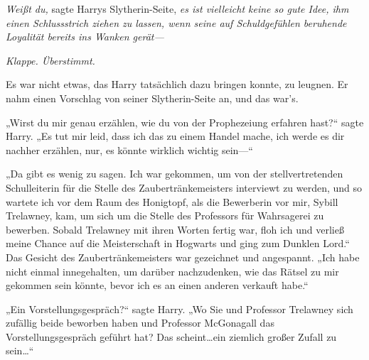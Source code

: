 \emph{Weißt du,} sagte Harrys Slytherin-Seite, \emph{es ist vielleicht keine so gute Idee, ihm einen Schlussstrich ziehen zu lassen, wenn seine auf Schuldgefühlen beruhende Loyalität bereits ins Wanken gerät—}

\emph{Klappe. Überstimmt.}

Es war nicht etwas, das Harry tatsächlich dazu bringen konnte, zu leugnen. Er nahm einen Vorschlag von seiner Slytherin-Seite an, und das war's.

„Wirst du mir genau erzählen, wie du von der Prophezeiung erfahren hast?“ sagte Harry. „Es tut mir leid, dass ich das zu einem Handel mache, ich werde es dir nachher erzählen, nur, es könnte wirklich wichtig sein—“

„Da gibt es wenig zu sagen. Ich war gekommen, um von der stellvertretenden Schulleiterin für die Stelle des Zaubertränkemeisters interviewt zu werden, und so wartete ich vor dem Raum des Honigtopf, als die Bewerberin vor mir, Sybill Trelawney, kam, um sich um die Stelle des Professors für Wahrsagerei zu bewerben. Sobald Trelawney mit ihren Worten fertig war, floh ich und verließ meine Chance auf die Meisterschaft in Hogwarts und ging zum Dunklen Lord.“
Das Gesicht des Zaubertränkemeisters war gezeichnet und angespannt.
„Ich habe nicht einmal innegehalten, um darüber nachzudenken, wie das Rätsel zu mir gekommen sein könnte, bevor ich es an einen anderen verkauft habe.“

„Ein Vorstellungsgespräch?“ sagte Harry. „Wo Sie und Professor Trelawney sich zufällig beide beworben haben und Professor McGonagall das Vorstellungsgespräch geführt hat? Das scheint…ein ziemlich großer Zufall zu sein…“

